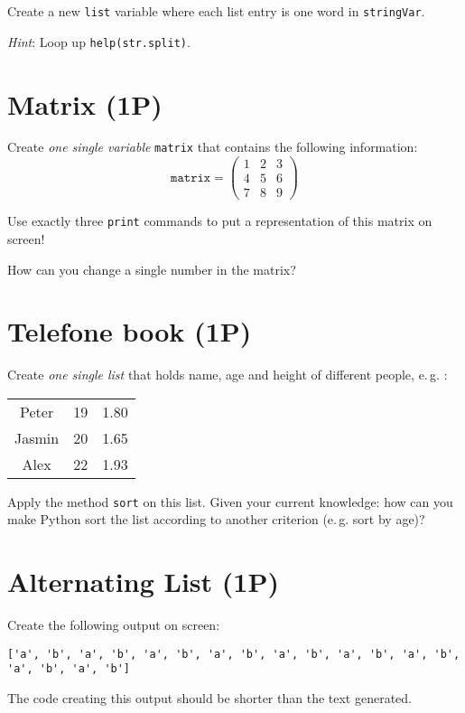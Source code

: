 \documentclass[
	ngerman,
	fontsize=10pt,
	parskip=half,
	titlepage=true,
	DIV=12
]{scrartcl}
\newcommand*{\inPy}[1]{\texttt{#1}}
\newcommand*{\eg}{e.\,g. }
\begin{document}
Create a new \inPy{list} variable where each list entry is one word in \texttt{stringVar}.

\emph{Hint}: Loop up \texttt{help(str.split)}.


\section{Matrix (1\;P)}
Create \emph{one single variable} \inPy{matrix} that contains the following information:
\begin{equation*}
	\texttt{matrix} = \begin{pmatrix}
		1 & 2 & 3 \\
		4 & 5 & 6 \\
		7 & 8 & 9
	\end{pmatrix}
\end{equation*}

Use exactly three \inPy{print} commands to put a representation of this matrix on screen!

How can you change a single number in the matrix?

\section{Telefone book (1\;P)}
Create \emph{one single list} that holds name, age and height of different people, \eg :
\begin{center}
	\begin{tabular}{ccc}
	Peter  & 19 & 1.80 \\
	Jasmin & 20 & 1.65 \\
	Alex   & 22 & 1.93
	\end{tabular}
\end{center}

Apply the method \inPy{sort} on this list. Given your current knowledge: how can you make Python sort the list according to another criterion (\eg sort by age)?

\section{Alternating List (1\;P)}
Create the following output on screen:

\begin{verbatim}
['a', 'b', 'a', 'b', 'a', 'b', 'a', 'b', 'a', 'b', 'a', 'b', 'a', 'b', 'a', 'b', 'a', 'b']
\end{verbatim}

The code creating this output should be shorter than the text generated.
\end{document}
